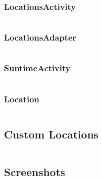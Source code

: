 \documentclass[11pt,english,numbers=endperiod,parskip=half]{scrartcl}
\begin{document}
\begin{landscape}

\subsubsection{LocationsActivity}
\inputminted[firstline=25, lastline=62]{java}{../../Apps/Suntime/app/src/main/java/au/net/danielparker/suntime/ui/LocationsActivity.java}

\subsubsection{LocationsAdapter}
\inputminted[firstline=16, lastline=38]{java}{../../Apps/Suntime/app/src/main/java/au/net/danielparker/suntime/ui/LocationsAdapter.java}

\subsubsection{SuntimeActivity}
\inputminted[firstline=21, lastline=80]{java}{../../Apps/Suntime/app/src/main/java/au/net/danielparker/suntime/ui/SuntimeActivity.java}

\subsubsection{Location}
\inputminted[firstline=15, lastline=71]{java}{../../Apps/Suntime/app/src/main/java/au/net/danielparker/suntime/models/Location.java}

\subsection{Custom Locations}
\inputminted[firstline=1, lastline=2]{text}{../../Apps/Suntime/app/src/main/assets/au_locations.txt}

\end{landscape}



\subsection{Screenshots}
\setlength\fboxsep{0pt}
\setlength\fboxrule{0.5pt}
\end{document}
